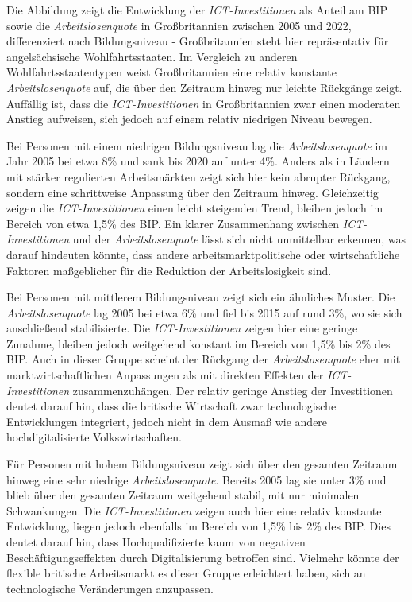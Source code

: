 Die Abbildung zeigt die Entwicklung der \textit{\ac{ICT}-Investitionen} als Anteil am BIP sowie 
die \textit{Arbeitslosenquote} in Großbritannien zwischen 2005 und 2022, differenziert nach 
Bildungsniveau - Großbritannien steht hier repräsentativ für angelsächsische Wohlfahrtsstaaten. 
Im Vergleich zu anderen Wohlfahrtsstaatentypen weist Großbritannien eine relativ konstante 
\textit{Arbeitslosenquote} auf, die über den Zeitraum hinweg nur leichte Rückgänge zeigt. 
Auffällig ist, dass die \textit{\ac{ICT}-Investitionen} in Großbritannien zwar einen moderaten 
Anstieg aufweisen, sich jedoch auf einem relativ niedrigen Niveau bewegen.

Bei Personen mit einem niedrigen Bildungsniveau lag die \textit{Arbeitslosenquote} im Jahr 2005 
bei etwa 8\% und sank bis 2020 auf unter 4\%. Anders als in Ländern mit stärker regulierten 
Arbeitsmärkten zeigt sich hier kein abrupter Rückgang, sondern eine schrittweise Anpassung über 
den Zeitraum hinweg. Gleichzeitig zeigen die \textit{\ac{ICT}-Investitionen} einen leicht 
steigenden Trend, bleiben jedoch im Bereich von etwa 1,5\% des BIP. Ein klarer Zusammenhang 
zwischen \textit{\ac{ICT}-Investitionen} und der \textit{Arbeitslosenquote} lässt sich nicht 
unmittelbar erkennen, was darauf hindeuten könnte, dass andere arbeitsmarktpolitische oder 
wirtschaftliche Faktoren maßgeblicher für die Reduktion der Arbeitslosigkeit sind.

Bei Personen mit mittlerem Bildungsniveau zeigt sich ein ähnliches Muster. Die 
\textit{Arbeitslosenquote} lag 2005 bei etwa 6\% und fiel bis 2015 auf rund 3\%, wo sie sich 
anschließend stabilisierte. Die \textit{\ac{ICT}-Investitionen} zeigen hier eine geringe Zunahme, 
bleiben jedoch weitgehend konstant im Bereich von 1,5\% bis 2\% des BIP. Auch in dieser Gruppe 
scheint der Rückgang der \textit{Arbeitslosenquote} eher mit marktwirtschaftlichen Anpassungen 
als mit direkten Effekten der \textit{\ac{ICT}-Investitionen} zusammenzuhängen. Der relativ 
geringe Anstieg der Investitionen deutet darauf hin, dass die britische Wirtschaft zwar 
technologische Entwicklungen integriert, jedoch nicht in dem Ausmaß wie andere hochdigitalisierte 
Volkswirtschaften.

Für Personen mit hohem Bildungsniveau zeigt sich über den gesamten Zeitraum hinweg eine sehr 
niedrige \textit{Arbeitslosenquote}. Bereits 2005 lag sie unter 3\% und blieb über den gesamten 
Zeitraum weitgehend stabil, mit nur minimalen Schwankungen. Die \textit{\ac{ICT}-Investitionen} 
zeigen auch hier eine relativ konstante Entwicklung, liegen jedoch ebenfalls im Bereich von 1,5\% 
bis 2\% des BIP. Dies deutet darauf hin, dass Hochqualifizierte kaum von negativen 
Beschäftigungseffekten durch Digitalisierung betroffen sind. Vielmehr könnte der flexible 
britische Arbeitsmarkt es dieser Gruppe erleichtert haben, sich an technologische Veränderungen 
anzupassen.

